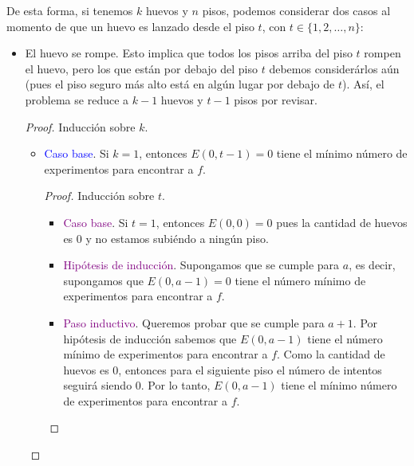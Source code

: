 \documentclass[letterpaper,11pt]{article}
\begin{document}
\begin{enumerate}
\begin{enumerate}
        De esta forma, si tenemos $k$ huevos y $n$ pisos, podemos considerar 
        dos casos al momento de que un huevo es lanzado desde el piso $t$, 
        con $t \in \{1, 2, \ldots, n\}$:
        \begin{itemize}
            \item El huevo se rompe. Esto implica que todos los pisos arriba 
            del piso $t$ rompen el huevo, pero los que están por debajo del 
            piso $t$ debemos considerárlos aún (pues el piso seguro más alto 
            está en algún lugar por debajo de $t$). Así, el problema se reduce 
            a $k-1$ huevos y $t-1$ pisos por revisar.
            \begin{proof}
                Inducción sobre $k$.
                \begin{itemize}
                    \item \textcolor{blue}{Caso base}. Si $k = 1$, entonces 
                    $E(0, t-1) = 0$ tiene el mínimo número de experimentos 
                    para encontrar a $f$.
                    \begin{proof}
                        Inducción sobre $t$.
                        \begin{itemize}
                            \item \textcolor{purple}{Caso base}. Si $t = 1$, 
                            entonces $E(0, 0) = 0$ pues la cantidad de huevos 
                            es $0$ y no estamos subiéndo a ningún piso.

                            \item \textcolor{purple}{Hipótesis de inducción}.
                            Supongamos que se cumple para $a$, es decir, 
                            supongamos que $E(0, a-1) = 0$ tiene el número 
                            mínimo de experimentos para encontrar a $f$. 

                            \item \textcolor{purple}{Paso inductivo}. Queremos 
                            probar que se cumple para $a+1$. Por hipótesis de 
                            inducción sabemos que $E(0,a-1)$ tiene el número 
                            mínimo de experimentos para encontrar a $f$. Como 
                            la cantidad de huevos es $0$, entonces para el 
                            siguiente piso el número de intentos seguirá 
                            siendo $0$. Por lo tanto, $E(0, a-1)$ tiene el 
                            mínimo número de experimentos para encontrar a 
                            $f$. 
                        \end{itemize}
                    \end{proof}


\end{itemize}
\end{proof}
\end{itemize}
\end{enumerate}
\end{enumerate}
\end{document}
